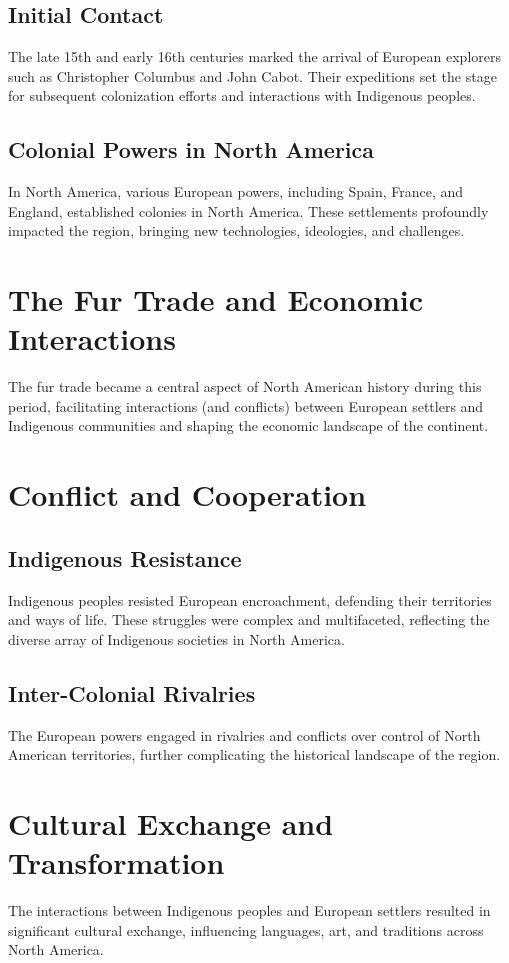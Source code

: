 \documentclass{book}
\begin{document}
\subsection{Initial Contact}
The late 15th and early 16th centuries marked the arrival of European explorers such as Christopher Columbus and John Cabot. Their expeditions set the stage for subsequent colonization efforts and interactions with Indigenous peoples.

\subsection{Colonial Powers in North America}
In North America, various European powers, including Spain, France, and England, established colonies in North America. These settlements profoundly impacted the region, bringing new technologies, ideologies, and challenges.

\section{The Fur Trade and Economic Interactions}
\label{sec:fur-trade-economic-interactions}
The fur trade became a central aspect of North American history during this period, facilitating interactions (and conflicts) between European settlers and Indigenous communities and shaping the economic landscape of the continent.

\section{Conflict and Cooperation}
\label{sec:conflict-cooperation}

\subsection{Indigenous Resistance}
Indigenous peoples resisted European encroachment, defending their territories and ways of life. These struggles were complex and multifaceted, reflecting the diverse array of Indigenous societies in North America.

\subsection{Inter-Colonial Rivalries}
The European powers engaged in rivalries and conflicts over control of North American territories, further complicating the historical landscape of the region.

\section{Cultural Exchange and Transformation}
\label{sec:cultural-exchange-transformation}
The interactions between Indigenous peoples and European settlers resulted in significant cultural exchange, influencing languages, art, and traditions across North America.
\end{document}
